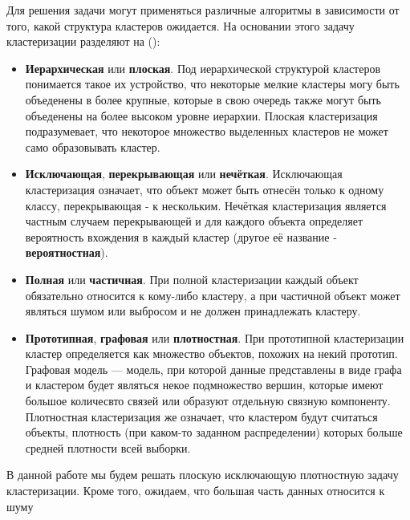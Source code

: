 \documentclass[12pt,fleqn]{article}
\begin{document}
Для решения задачи могут применяться различные алгоритмы в зависимости от того, какой структура кластеров ожидается. На основании этого задачу кластеризации разделяют на (\cite{cluster_class}):
\begin{itemize}
\item \textbf{Иерархическая} или \textbf{плоская}. Под иерархической  структурой кластеров понимается такое их устройство, что некоторые мелкие кластеры могу быть объеденены в более крупные, которые в свою очередь также могут быть объеденены на более высоком уровне иерархии. Плоская кластеризация подразумевает, что некоторое множество выделенных кластеров не может само образовывать кластер.
\item \textbf{Исключающая}, \textbf{перекрывающая} или \textbf{нечёткая}. Исключающая кластеризация означает, что объект может быть отнесён только к одному классу, перекрывающая - к нескольким. Нечёткая кластеризация является частным случаем перекрывающей и для каждого объекта определяет вероятность вхождения в каждый кластер (другое её название - \textbf{вероятностная}).
\item \textbf{Полная} или \textbf{частичная}. При полной кластеризации каждый объект обязательно относится к кому-либо кластеру, а при частичной объект может являться шумом или выбросом и не должен принадлежать кластеру.
\item \textbf{Прототипная}, \textbf{графовая} или \textbf{плотностная}. При прототипной кластеризации кластер определяется как множество объектов, похожих на некий прототип. Графовая модель --- модель, при которой данные представлены в виде графа и кластером будет являться некое подмножество вершин, которые имеют большое количесвто связей или образуют отдельную связную компоненту. Плотностная кластеризация же означает, что кластером будут считаться объекты, плотность (при каком-то заданном распределении) которых больше средней плотности всей выборки.
\end{itemize}

В данной работе мы будем решать плоскую исключающую плотностную задачу кластеризации. Кроме того, ожидаем, что большая часть данных относится к шуму
\end{document}
